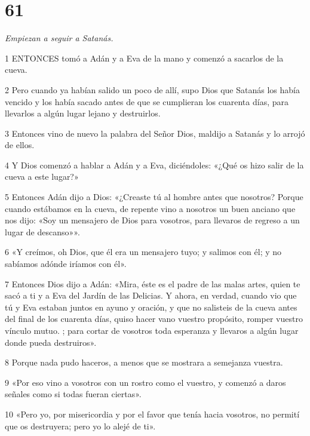\chapter{61}

\par \textit{Empiezan a seguir a Satanás.}

\par 1 ENTONCES tomó a Adán y a Eva de la mano y comenzó a sacarlos de la cueva.

\par 2 Pero cuando ya habían salido un poco de allí, supo Dios que Satanás los había vencido y los había sacado antes de que se cumplieran los cuarenta días, para llevarlos a algún lugar lejano y destruirlos.

\par 3 Entonces vino de nuevo la palabra del Señor Dios, maldijo a Satanás y lo arrojó de ellos.

\par 4 Y Dios comenzó a hablar a Adán y a Eva, diciéndoles: «¿Qué os hizo salir de la cueva a este lugar?»

\par 5 Entonces Adán dijo a Dios: «¿Creaste tú al hombre antes que nosotros? Porque cuando estábamos en la cueva, de repente vino a nosotros un buen anciano que nos dijo: «Soy un mensajero de Dios para vosotros, para llevaros de regreso a un lugar de descanso»».

\par 6 «Y creímos, oh Dios, que él era un mensajero tuyo; y salimos con él; y no sabíamos adónde iríamos con él».

\par 7 Entonces Dios dijo a Adán: «Mira, éste es el padre de las malas artes, quien te sacó a ti y a Eva del Jardín de las Delicias. Y ahora, en verdad, cuando vio que tú y Eva estaban juntos en ayuno y oración, y que no salisteis de la cueva antes del final de los cuarenta días, quiso hacer vano vuestro propósito, romper vuestro vínculo mutuo. ; para cortar de vosotros toda esperanza y llevaros a algún lugar donde pueda destruiros».

\par 8 Porque nada pudo haceros, a menos que se mostrara a semejanza vuestra.

\par 9 «Por eso vino a vosotros con un rostro como el vuestro, y comenzó a daros señales como si todas fueran ciertas».

\par 10 «Pero yo, por misericordia y por el favor que tenía hacia vosotros, no permití que os destruyera; pero yo lo alejé de ti».

